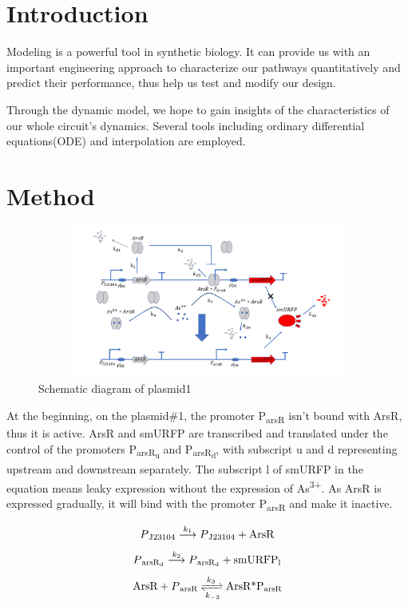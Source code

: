 \section{Introduction}
Modeling is a powerful tool in synthetic biology. It can provide us with an important engineering approach to characterize our pathways quantitatively and predict their performance, thus help us test and modify our design.

Through the dynamic model, we hope to gain insights of the characteristics of our whole circuit's dynamics. Several tools including ordinary differential equations(ODE) and interpolation are employed.


\section{Method}

\begin{figure}[h]
\centering
\includegraphics[width=12cm,height=5cm]{1}
\caption{Schematic diagram of plasmid1}
\end{figure}

At the beginning, on the plasmid\#1, the promoter P\textsubscript{arsR} isn't bound with ArsR, thus it is active. ArsR and smURFP are transcribed and translated under the control of the promoters P\textsubscript{arsR\textsubscript{u}} and P\textsubscript{arsR\textsubscript{d}}, with subscript u and d representing upstream and downstream separately. The subscript l of smURFP in the equation means leaky expression without the expression of As\textsuperscript{3+}. As ArsR is expressed gradually, it will bind with the promoter P\textsubscript{arsR} and make it inactive. \cite{pola2018novel}

\begin{equation}
P\textsubscript{J23104}\stackrel{k_1}{\longrightarrow} P\textsubscript{J23104}+\text{ArsR}
\end{equation}
\begin{equation}
P\textsubscript{arsR\textsubscript{d}} \stackrel{k_2}{\longrightarrow} P\textsubscript{arsR\textsubscript{d}} +\text{smURFP\textsubscript{l}}
\end{equation}
\begin{equation}
\text{ArsR}+P\textsubscript{arsR} \xrightleftharpoons[k_{-3}]{k_3}\text{ArsR*P\textsubscript{arsR}}
\end{equation} 

